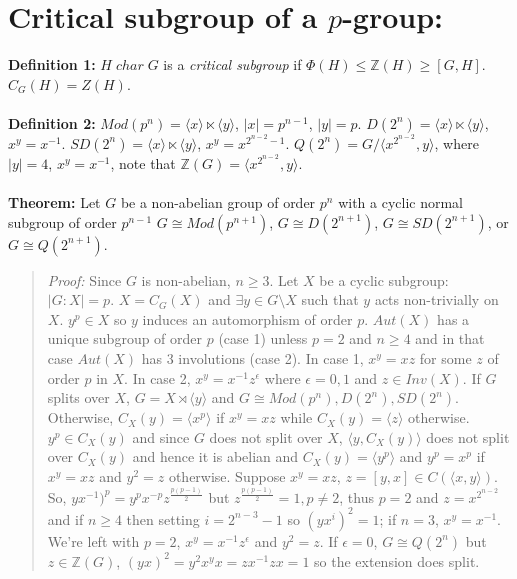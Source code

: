 \section{Critical subgroup of a $p$-group:}
{\bf Definition 1:}
$H \; char \; G$ is a \emph {critical subgroup} if $\Phi(H) \le {\mathbb Z}(H) \ge [G,H]$.
$C_G(H)=Z(H)$.  
\\
\\
{\bf Definition 2:}  
$Mod(p^n)= \langle x \rangle \ltimes \langle y \rangle $, $|x|= p^{n-1}$, $|y|=p$.
$D(2^n)= \langle x \rangle \ltimes \langle y \rangle $, $x^y = x^{-1}$.
$SD(2^n)= \langle x \rangle \ltimes \langle y \rangle $, $x^y = x^{2^{n-2}-1}$.
$Q(2^n)= G/ \langle x^{2^{n-2}}, y \rangle $, where $|y|=4$, $x^y= x^{-1}$, note that
${\mathbb Z}(G)= \langle x^{2^{n-2}}, y \rangle $.
\\
\\
{\bf Theorem:}  Let $G$ be a non-abelian group of order $p^n$ with a cyclic normal subgroup
of order $p^{n-1}$ 
$G \cong Mod(p^{n+1})$,
$G \cong D(2^{n+1})$,
$G \cong SD(2^{n+1})$, or
$G \cong Q(2^{n+1})$.
\begin{quote}
\emph{Proof:} Since $G$ is non-abelian, $n \ge 3$.  Let $X$ be a cyclic subgroup: $|G:X|=p$.
$X=C_G(X)$ and $\exists y \in G \setminus X$ such that $y$ acts non-trivially on $X$.
$y^p \in X$ so $y$ induces an automorphism of order $p$.  $Aut(X)$ has a unique subgroup
of order $p$ (case 1) unless $p=2$ and $n \ge 4$ and in that case $Aut(X)$ has $3$ involutions
(case 2).  In case 1, $x^y=xz$ for some $z$ of order $p$ in $X$.  In case 2,
$x^y=x^{-1} z^{\epsilon}$ where $\epsilon= 0, 1$ and $z \in Inv(X)$.  If $G$ splits over $X$,
$G=X \rtimes \langle y \rangle $ and $G \cong Mod(p^n),  D(2^n), SD(2^n)$.  Otherwise,
$C_X(y)= \langle x^p \rangle $ if $x^y=xz$ while $C_X(y)= \langle z \rangle $ otherwise.  
$y^p \in C_X(y)$ and since $G$ does
not split over $X$,  $ \langle y, C_X(y) \rangle $ does not split over 
$C_X(y)$ and hence it is abelian and
$C_X(y)= \langle y^p \rangle $ and $y^p = x^p$ if $x^y=xz$ and $y^2 = z$ otherwise.  
Suppose $x^y=xz$,
$z=[y,x] \in C( \langle x,y \rangle)$.  So, $y x^{-1})^p= y^p x^{-p} z^{\frac {p(p-1)} {2}}$
but $z^{\frac {p(p-1)} {2}}=1, p \ne 2$, thus $p=2$ and $z=x^{2^{n-2}}$
and if $n \ge 4$ then setting $i= 2^{n-3}-1$ so $(y x^i)^2=1$; if $n=3$, $x^y= x^{-1}$.
We're left with $p=2$, $x^y= x^{-1}z^{\epsilon}$ and $y^2=z$.  If $\epsilon=0$,
$G \cong Q(2^n)$ but $z \in {\mathbb Z}(G)$, $(yx)^2= y^2 x^y x = z x^{-1} z x = 1$ so
the extension does split.
\end{quote}
